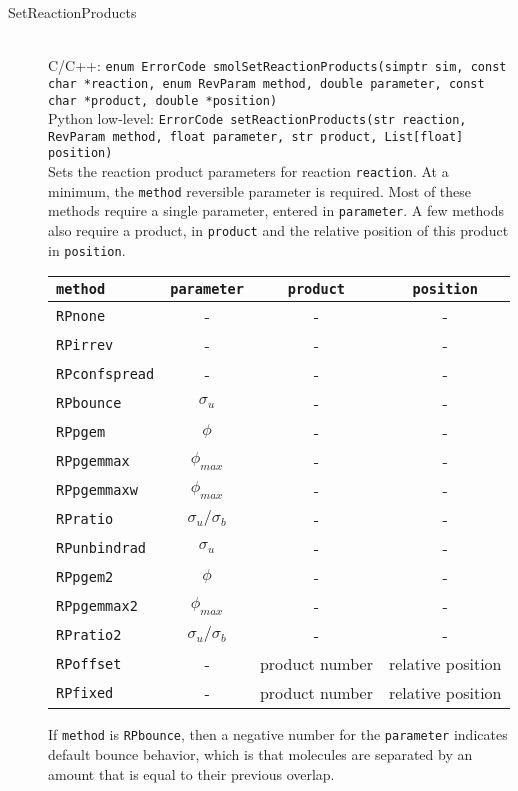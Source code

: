 \documentclass {book}
\newcommand {\ttt} {\texttt}
\begin{document}
\begin{description}
\item[SetReactionProducts]
\hfill \\
C/C++: \ttt{enum ErrorCode smolSetReactionProducts(simptr sim, const char *reaction, enum RevParam method, double parameter, const char *product, double *position)}\\
Python low-level: \ttt{ErrorCode setReactionProducts(str reaction, RevParam method, float parameter, str product, List[float] position)}\\
Sets the reaction product parameters for reaction \ttt{reaction}. At a minimum, the \ttt{method} reversible parameter is required. Most of these methods require a single parameter, entered in \ttt{parameter}. A few methods also require a product, in \ttt{product} and the relative position of this product in \ttt{position}.

\begin{longtable}[c]{lccc}
\ttt{method} & \ttt{parameter} & \ttt{product} & \ttt{position}\\
\hline
\ttt{RPnone} & - & - & -\\
\ttt{RPirrev} & - & - & -\\
\ttt{RPconfspread} & - & - & -\\
\ttt{RPbounce} & $\sigma_u$ & - & -\\
\ttt{RPpgem} & $\phi$ & - & -\\
\ttt{RPpgemmax} & $\phi_{max}$ & - & -\\
\ttt{RPpgemmaxw} & $\phi_{max}$ & - & -\\
\ttt{RPratio} & $\sigma_u/\sigma_b$ & - & -\\
\ttt{RPunbindrad} & $\sigma_u$ & - & -\\
\ttt{RPpgem2} & $\phi$ & - & -\\
\ttt{RPpgemmax2} & $\phi_{max}$ & - & -\\
\ttt{RPratio2} & $\sigma_u/\sigma_b$ & - & -\\
\ttt{RPoffset} & - & product number & relative position\\
\ttt{RPfixed} & - & product number & relative position\\
\end{longtable}

If \ttt{method} is \ttt{RPbounce}, then a negative number for the \ttt{parameter} indicates default bounce behavior, which is that molecules are separated by an amount that is equal to their previous overlap.

\end{description}
\end{document}
